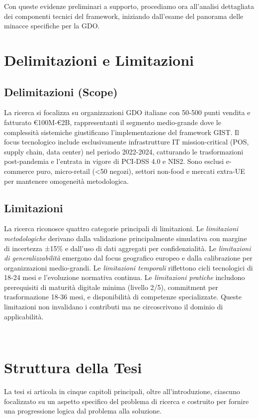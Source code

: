 Con queste evidenze preliminari a supporto, procediamo ora all'analisi dettagliata dei componenti tecnici del framework, iniziando dall'esame del panorama delle minacce specifiche per la GDO.


\section{\texorpdfstring{\textbf{Delimitazioni e
Limitazioni}}{1.6 Delimitazioni e Limitazioni}}\label{delimitazioni-e-limitazioni}
\subsection{\texorpdfstring{\textbf{Delimitazioni
(Scope)}}{1.6.1 Delimitazioni (Scope)}}\label{delimitazioni-scope}

La ricerca si focalizza su organizzazioni GDO italiane con 50-500 punti vendita e fatturato €100M-€2B, rappresentanti il segmento medio-grande dove le complessità sistemiche giustificano l'implementazione del framework GIST. Il focus tecnologico include esclusivamente infrastrutture IT mission-critical (POS, supply chain, data center) nel periodo 2022-2024, catturando le trasformazioni post-pandemia e l'entrata in vigore di PCI-DSS 4.0 e NIS2. Sono esclusi e-commerce puro, micro-retail (<50 negozi), settori non-food e mercati extra-UE per mantenere omogeneità metodologica.

\subsection{\texorpdfstring{\textbf{Limitazioni}}{1.6.2 Limitazioni}}\label{limitazioni}

La ricerca riconosce quattro categorie principali di limitazioni. Le \textit{limitazioni metodologiche} derivano dalla validazione principalmente simulativa con margine di incertezza ±15\% e dall'uso di dati aggregati per confidenzialità. Le \textit{limitazioni di generalizzabilità} emergono dal focus geografico europeo e dalla calibrazione per organizzazioni medio-grandi. Le \textit{limitazioni temporali} riflettono cicli tecnologici di 18-24 mesi e l'evoluzione normativa continua. Le \textit{limitazioni pratiche} includono prerequisiti di maturità digitale minima (livello 2/5), commitment per trasformazione 18-36 mesi, e disponibilità di competenze specializzate. Queste limitazioni non invalidano i contributi ma ne circoscrivono il dominio di applicabilità.

\
\section{\texorpdfstring{\textbf{Struttura della
Tesi}}{1.7 Struttura della Tesi}}\label{struttura-della-tesi}
La tesi si articola in cinque capitoli principali, oltre all'introduzione, ciascuno focalizzato su un aspetto specifico del problema di ricerca e costruito per fornire una progressione logica dal problema alla soluzione.

